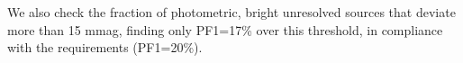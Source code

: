 \documentclass[\docopts]{\docclass}
\begin{document}



We also check the fraction of photometric, bright unresolved sources that deviate more than 15 mmag, finding only PF1=17\% over this threshold, in compliance with the requirements (PF1=20\%).
\end{document}
